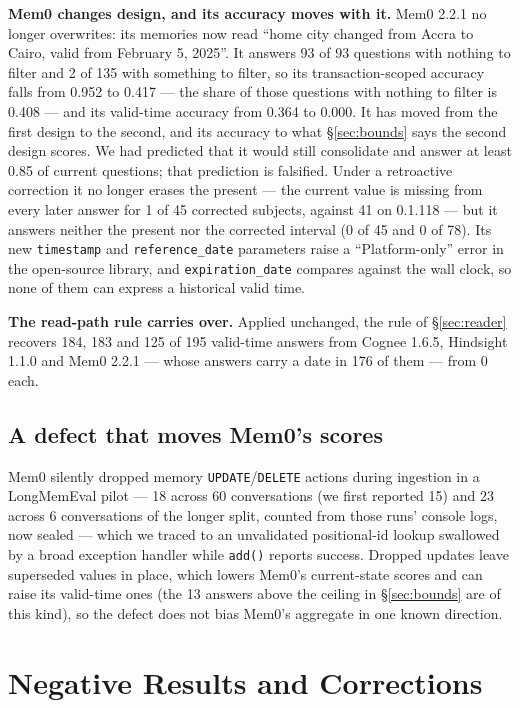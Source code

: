 \documentclass[conference]{IEEEtran}
\begin{document}
\textbf{Mem0 changes design, and its accuracy moves with it.} Mem0 2.2.1 no
longer overwrites: its memories now read ``home city changed from Accra to
Cairo, valid from February 5, 2025''. It answers 93 of 93 questions with
nothing to filter and 2 of 135 with something to filter, so its
transaction-scoped accuracy falls from 0.952 to 0.417 --- the share of those
questions with nothing to filter is 0.408 --- and its valid-time accuracy from
0.364 to 0.000. It has moved from the first design to the second, and its
accuracy to what \S\ref{sec:bounds} says the second design scores. We had
predicted that it would still consolidate and answer at least 0.85 of current
questions; that prediction is falsified. Under a retroactive correction it no
longer erases the present --- the current value is missing from every later
answer for 1 of 45 corrected subjects, against 41 on 0.1.118 --- but it answers
neither the present nor the corrected interval (0 of 45 and 0 of 78). Its new \texttt{timestamp} and \texttt{reference\_date}
parameters raise a ``Platform-only'' error in the open-source library, and
\texttt{expiration\_date} compares against the wall clock, so none of them can
express a historical valid time.

\textbf{The read-path rule carries over.} Applied unchanged, the rule of
\S\ref{sec:reader} recovers 184, 183 and 125 of 195 valid-time answers from
Cognee 1.6.5, Hindsight 1.1.0 and Mem0 2.2.1 --- whose answers carry a date in
176 of them --- from 0 each.

\subsection{A defect that moves Mem0's scores}\label{sec:external}

Mem0 silently dropped memory \texttt{UPDATE}/\texttt{DELETE} actions
during ingestion in a LongMemEval pilot --- 18 across 60 conversations (we first
reported 15) and 23 across 6 conversations of the longer split, counted from
those runs' console logs, now sealed --- which we traced to an unvalidated
positional-id lookup swallowed by a broad exception handler while
\texttt{add()} reports success. Dropped updates leave superseded values in
place, which lowers Mem0's current-state scores and can raise its valid-time
ones (the 13 answers above the ceiling in \S\ref{sec:bounds} are of this kind),
so the defect does not bias Mem0's aggregate in one known direction.

\section{Negative Results and Corrections}\label{sec:negative}
\end{document}
